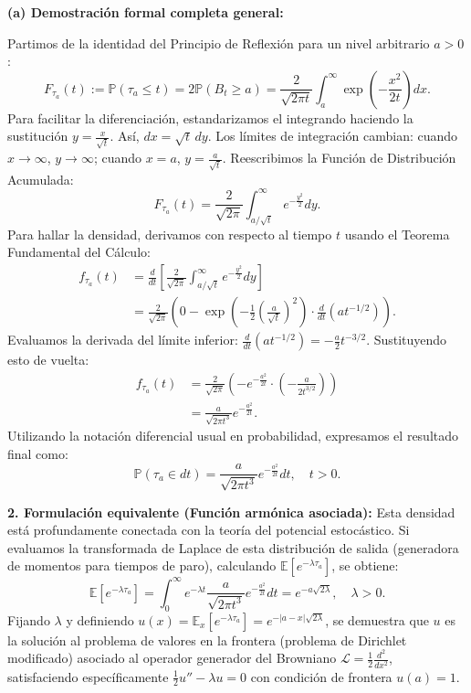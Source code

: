 \documentclass[11pt, letterpaper]{article}
\begin{document}
\begin{solucion}
    \vspace{3mm}
    \textbf{(a) Demostración formal completa general:}
    
    Partimos de la identidad del Principio de Reflexión para un nivel arbitrario $a > 0$:
    \[ F_{\tau_a}(t) := \mathbb{P}(\tau_a \le t) = 2\mathbb{P}(B_t \ge a) = \frac{2}{\sqrt{2\pi t}} \int_a^\infty \exp\left(-\frac{x^2}{2t}\right) dx. \]
    Para facilitar la diferenciación, estandarizamos el integrando haciendo la sustitución $y = \frac{x}{\sqrt{t}}$. Así, $dx = \sqrt{t} \, dy$. 
    Los límites de integración cambian: cuando $x \to \infty$, $y \to \infty$; cuando $x = a$, $y = \frac{a}{\sqrt{t}}$. 
    Reescribimos la Función de Distribución Acumulada:
    \[ F_{\tau_a}(t) = \frac{2}{\sqrt{2\pi}} \int_{a/\sqrt{t}}^\infty e^{-\frac{y^2}{2}} dy. \]
    Para hallar la densidad, derivamos con respecto al tiempo $t$ usando el Teorema Fundamental del Cálculo:
    \begin{align*}
        f_{\tau_a}(t) &= \frac{d}{dt} \left[ \frac{2}{\sqrt{2\pi}} \int_{a/\sqrt{t}}^\infty e^{-\frac{y^2}{2}} dy \right] \\
        &= \frac{2}{\sqrt{2\pi}} \left( 0 - \exp\left(-\frac{1}{2}\left(\frac{a}{\sqrt{t}}\right)^2\right) \cdot \frac{d}{dt}\left(a t^{-1/2}\right) \right).
    \end{align*}
    Evaluamos la derivada del límite inferior: $\frac{d}{dt}\left(a t^{-1/2}\right) = -\frac{a}{2} t^{-3/2}$.
    Sustituyendo esto de vuelta:
    \begin{align*}
        f_{\tau_a}(t) &= \frac{2}{\sqrt{2\pi}} \left( - e^{-\frac{a^2}{2t}} \cdot \left(-\frac{a}{2 t^{3/2}}\right) \right) \\
        &= \frac{a}{\sqrt{2\pi t^3}} e^{-\frac{a^2}{2t}}.
    \end{align*}
    Utilizando la notación diferencial usual en probabilidad, expresamos el resultado final como:
    \[ \mathbb{P}(\tau_a \in dt) = \frac{a}{\sqrt{2\pi t^3}} e^{-\frac{a^2}{2t}} dt, \quad t > 0. \]

    \textbf{2. Formulación equivalente (Función armónica asociada):}
    Esta densidad está profundamente conectada con la teoría del potencial estocástico. Si evaluamos la transformada de Laplace de esta distribución de salida (generadora de momentos para tiempos de paro), calculando $\mathbb{E}[e^{-\lambda \tau_a}]$, se obtiene:
    \[ \mathbb{E}[e^{-\lambda \tau_a}] = \int_0^\infty e^{-\lambda t} \frac{a}{\sqrt{2\pi t^3}} e^{-\frac{a^2}{2t}} dt = e^{-a\sqrt{2\lambda}}, \quad \lambda > 0. \]
    Fijando $\lambda$ y definiendo $u(x) = \mathbb{E}_x[e^{-\lambda \tau_a}] = e^{-|a-x|\sqrt{2\lambda}}$, se demuestra que $u$ es la solución al problema de valores en la frontera (problema de Dirichlet modificado) asociado al operador generador del Browniano $\mathcal{L} = \frac{1}{2}\frac{d^2}{dx^2}$, satisfaciendo específicamente $\frac{1}{2}u'' - \lambda u = 0$ con condición de frontera $u(a) = 1$.
\end{solucion}
\end{document}
